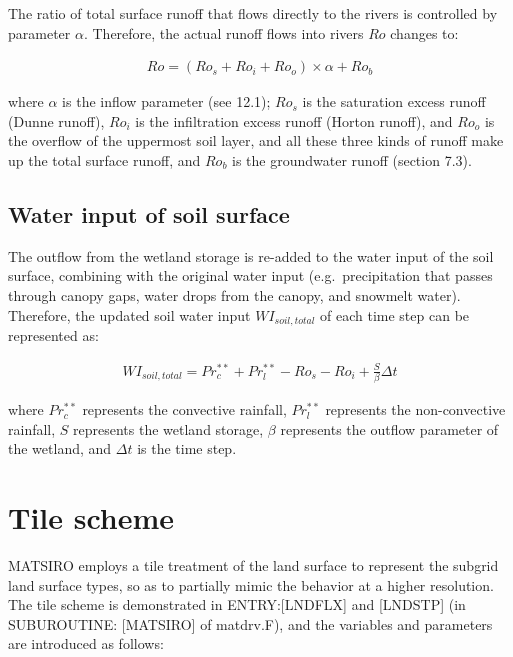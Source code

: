 The ratio of total surface runoff that flows directly to the rivers is controlled by parameter \(\alpha\). Therefore, the actual runoff flows into rivers \(Ro\) changes to:

\begin{eqnarray}
Ro=(Ro_{s}+Ro_{i}+Ro_{o})\times \alpha + Ro_{b}
\end{eqnarray}

where \(\alpha\) is the inflow parameter (see 12.1); \(Ro_{s}\) is the saturation excess runoff (Dunne runoff), \(Ro_{i}\) is the infiltration excess runoff (Horton runoff), and \(Ro_{o}\) is the
overflow of the uppermost soil layer, and all these three kinds of runoff make up the total surface runoff, and \(Ro_{b}\) is the groundwater runoff (section 7.3).

\hypertarget{water-input-of-soil-surface}{%
\subsection{Water input of soil surface}\label{water-input-of-soil-surface}}

The outflow from the wetland storage is re-added to the water input of the soil surface, combining with the original water input (e.g.~precipitation that passes through canopy gaps, water drops from
the canopy, and snowmelt water). Therefore, the updated soil water input \(WI_{soil,total}\) of each time step can be represented as:

\begin{eqnarray}
WI_{soil,total}=Pr_{c}^{**}+Pr_{l}^{**}-Ro_{s}-Ro_{i}+\frac{S}{\beta }\Delta t
\end{eqnarray}

where \(Pr_{c}^{**}\) represents the convective rainfall, \(Pr_{l}^{**}\) represents the non-convective rainfall, \(S\) represents the wetland storage, \(\beta\) represents the outflow parameter of
the wetland, and \(\Delta t\) is the time step.

\hypertarget{tile-scheme}{%
\section{Tile scheme}\label{tile-scheme}}

MATSIRO employs a tile treatment of the land surface to represent the subgrid land surface types, so as to partially mimic the behavior at a higher resolution. The tile scheme is demonstrated in
ENTRY:{[}LNDFLX{]} and {[}LNDSTP{]} (in SUBUROUTINE: {[}MATSIRO{]} of matdrv.F), and the variables and parameters are introduced as follows:


